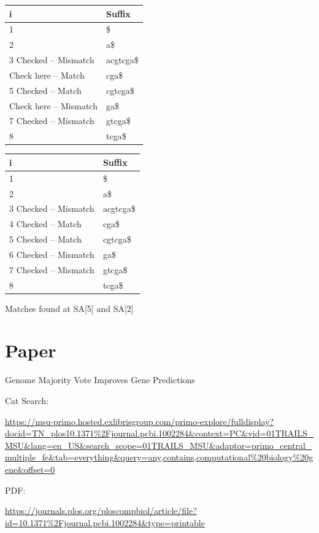 \documentclass{article}
\begin{document}
\vspace{.5cm}

\bgroup
\def\arraystretch{1.5}%
\begin{tabularx}{8cm}{| X | X |}
  \hline
  \textbf{i} & \textbf{Suffix}\\
  \hline
  1 & \$		\\
  2 & a\$		\\
  3 Checked -- Mismatch & acgtcga\$ \\
  Check here -- Match & cga\$		\\ 
  5 Checked -- Match & cgtcga\$ \\
  Check here -- Mismatch & ga\$		\\
  7 Checked -- Mismatch & gtcga\$	\\
  8 & tcga\$	\\
  \hline
\end{tabularx}
\egroup

\vspace{.5cm}

\bgroup
\def\arraystretch{1.5}%
\begin{tabularx}{8cm}{| X | X |}
  \hline
  \textbf{i} & \textbf{Suffix}\\
  \hline
  1 & \$		\\
  2 & a\$		\\
  3 Checked -- Mismatch & acgtcga\$ \\
  4 Checked -- Match & cga\$		\\ 
  5 Checked -- Match & cgtcga\$ \\
  6 Checked -- Mismatch & ga\$		\\
  7 Checked -- Mismatch & gtcga\$	\\
  8 & tcga\$	\\
  \hline
\end{tabularx}
\egroup

\vspace{.5cm}
Matches found at SA[5] and SA[2]

\section{Paper}

Genome Majority Vote Improves Gene Predictions

\vspace{.2cm}

Cat Search:

\vspace{.2cm}

\url{https://msu-primo.hosted.exlibrisgroup.com/primo-explore/fulldisplay?docid=TN_plos10.1371%2Fjournal.pcbi.1002284&context=PC&vid=01TRAILS_MSU&lang=en_US&search_scope=01TRAILS_MSU&adaptor=primo_central_multiple_fe&tab=everything&query=any,contains,computational%20biology%20gene&offset=0}

\vspace{.2cm}

PDF:

\vspace{.2cm}

\url{https://journals.plos.org/ploscompbiol/article/file?id=10.1371\%2Fjournal.pcbi.1002284&type=printable}
\end{document}
